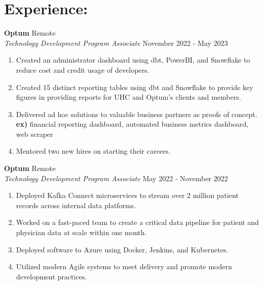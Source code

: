 \documentclass[10pt]{article}
\begin{document}
\section*{Experience: \hrulefill}
		\noindent 
		\textbf{Optum} \hfill Remote \\
		\textit{Technology Development Program Associate} \hfill November 2022 - May 2023
		\begin{enumerate}[label=--]
			\item Created an administrator dashboard using dbt, PowerBI, and Snowflake to reduce cost and credit usage of developers. 
			\item Created 15 distinct reporting tables using dbt and Snowflake to provide key figures in providing reports for UHC and Optum's clients and members. 
			\item Delivered ad hoc solutions to valuable business partners as proofs of concept. \\ \textbf{ex)} financial reporting dashboard, automated business metrics dashboard, web scraper
			\item Mentored two new hires on starting their careers.
		\end{enumerate}
			
		\noindent
		\textbf{Optum} \hfill Remote \\
		\textit{Technology Development Program Associate} \hfill May 2022 - November 2022
		\begin{enumerate}[label=--]
			\item Deployed Kafka Connect microservices to stream over 2 million patient records across internal data platforms. 
			\item Worked on a fast-paced team to create a critical data pipeline for patient and physician data at scale within one month.
			\item Deployed software to Azure using Docker, Jenkins, and Kubernetes.
			\item Utilized modern Agile systems to meet delivery and promote modern development practices.
		\end{enumerate}
		
		
\end{document}
